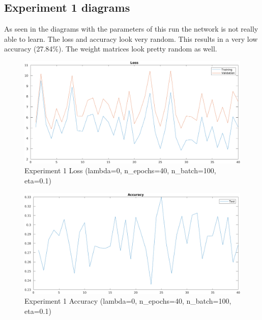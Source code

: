 \newpage

\subsection{Experiment 1 diagrams}
As seen in the diagrams with the parameters of this run the network is not really able to learn. The loss and accuracy look very random. 
This results in a very low accuracy (27.84\%). The weight matrices look pretty random as well.

    \begin{figure}[ht]
        \includegraphics[width=\textwidth]{../code/result_pics/lambda=0, n_epochs=40, n_batch=100, eta=.1/loss.png}
        \caption{Experiment 1 Loss (lambda=0, n\_epochs=40, n\_batch=100, eta=0.1)}
        \label{fig:loss1}
    \end{figure}

    \begin{figure}[ht]
        \includegraphics[width=\textwidth]{../code/result_pics/lambda=0, n_epochs=40, n_batch=100, eta=.1/accuracy.png}
        \caption{Experiment 1 Accuracy (lambda=0, n\_epochs=40, n\_batch=100, eta=0.1)}
        \label{fig:accuracy1}
    \end{figure}

